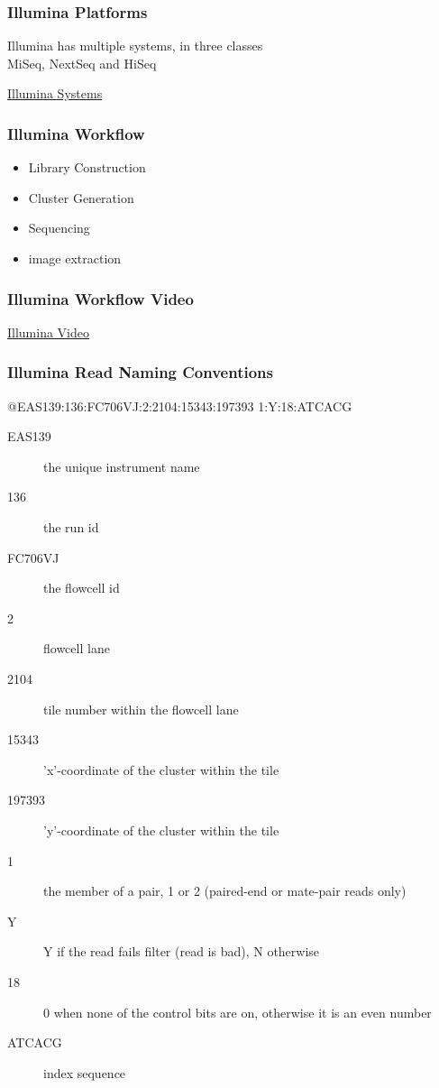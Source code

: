 \documentclass{beamer}
\begin{document}
\begin{frame}
  \frametitle{Illumina Platforms}
Illumina has multiple systems, in three classes\\ MiSeq, NextSeq and HiSeq
    \begin{center}
    \href{http://www.illumina.com/systems.html}{Illumina Systems}
    \end{center}
\end{frame}

\begin{frame}
  \frametitle{Illumina Workflow}
  \begin{itemize}
  \item Library Construction
  \item Cluster Generation
  \item Sequencing
  \item image extraction
  \end{itemize}
\end{frame}


\begin{frame}
  \frametitle{Illumina Workflow Video}
  \begin{center}
  \href{http://www.youtube.com/watch?NR=1&feature=endscreen&v=l99aKKHcxC4}{Illumina Video}
  \end{center}
\end{frame} 

    
\begin{frame}
  \frametitle{Illumina Read Naming Conventions}
  \begin{small}
  @EAS139:136:FC706VJ:2:2104:15343:197393 1:Y:18:ATCACG\\
  \end{small}  
  \begin{description}
  \item[EAS139]	the unique instrument name
  \item[136]	the run id
  \item[FC706VJ]	the flowcell id
  \item[2]	flowcell lane
  \item[2104]	tile number within the flowcell lane
  \item[15343]	'x'-coordinate of the cluster within the tile
  \item[197393]	'y'-coordinate of the cluster within the tile
  \item[1]	the member of a pair, 1 or 2 (paired-end or mate-pair reads only)
  \item[Y]	Y if the read fails filter (read is bad), N otherwise
  \item[18]	0 when none of the control bits are on, otherwise it is an even     number
  \item[ATCACG]	index sequence
  \end{description}
\end{frame}
\end{document}
